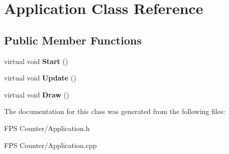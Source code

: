 \hypertarget{class_application}{}\section{Application Class Reference}
\label{class_application}
\subsection*{Public Member Functions}
\begin{DoxyCompactItemize}
\item 
\mbox{\label{class_application_adedfa7e821be70b6c9f47086cdaade1d}} 
virtual void {\bfseries Start} ()
\item 
\mbox{\label{class_application_a72f9820ca25c093f6c2c4b2812f6a2a4}} 
virtual void {\bfseries Update} ()
\item 
\mbox{\label{class_application_a96f945185d337b6de42cd6d0ec8553e3}} 
virtual void {\bfseries Draw} ()
\end{DoxyCompactItemize}


The documentation for this class was generated from the following files\+:\begin{DoxyCompactItemize}
\item 
F\+P\+S Counter/Application.\+h\item 
F\+P\+S Counter/Application.\+cpp\end{DoxyCompactItemize}
